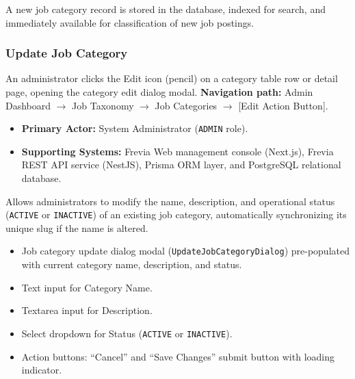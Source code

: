\noindent A new job category record is stored in the database, indexed for search, and immediately available for classification of new job postings.

\subsubsection{ Update Job Category}

An administrator clicks the Edit icon (pencil) on a category table row or detail page, opening the category edit dialog modal.\newline
\textbf{Navigation path:} Admin Dashboard $\rightarrow$ Job Taxonomy $\rightarrow$ Job Categories $\rightarrow$ [Edit Action Button].


\begin{itemize}[leftmargin=1.6em,topsep=3pt,itemsep=2pt,parsep=0pt,label=$\bullet$]
    \item \textbf{Primary Actor:} System Administrator (\texttt{ADMIN} role).
    \item \textbf{Supporting Systems:} Frevia Web management console (Next.js), Frevia REST API service (NestJS), Prisma ORM layer, and PostgreSQL relational database.
\end{itemize}

\noindent Allows administrators to modify the name, description, and operational status (\texttt{ACTIVE} or \texttt{INACTIVE}) of an existing job category, automatically synchronizing its unique slug if the name is altered.

\begin{itemize}[leftmargin=1.6em,topsep=3pt,itemsep=2pt,parsep=0pt,label=$\bullet$]
    \item Job category update dialog modal (\texttt{UpdateJobCategoryDialog}) pre-populated with current category name, description, and status.
    \item Text input for Category Name.
    \item Textarea input for Description.
    \item Select dropdown for Status (\texttt{ACTIVE} or \texttt{INACTIVE}).
    \item Action buttons: ``Cancel'' and ``Save Changes'' submit button with loading indicator.
\end{itemize}

